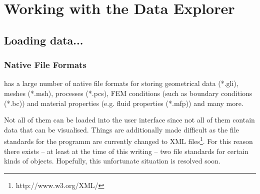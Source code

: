 \chapter{Working with the Data Explorer}

\section{Loading data...}

\subsection{Native File Formats}
\label{nativefileformats}

\ogs has a large number of native file formats for storing geometrical data (*.gli), meshes (*.msh), processes (*.pcs), FEM conditions (such as boundary conditions (*.bc)) and material properties (e.g. fluid properties (*.mfp)) and many more.

Not all of them can be loaded into the user interface since not all of them contain data that can be visualised. Things are additionally made difficult as the file standards for the programm are currently changed to XML files\footnote{http://www.w3.org/XML/}. For this reason there exists -- at least at the time of this writing -- two file standards for certain kinds of objects. Hopefully, this unfortunate situation is resolved soon.

